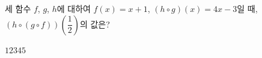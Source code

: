 \hspace*{2mm}\begin{minipage}[t]{\dimexpr\linewidth-2mm\relax}\vspace{0pt}
세 함수 $f$, $g$, $h$에 대하여 $f(x)=x+1$, $(h\circ g)(x)=4x-3$일 때, $(h\circ(g\circ f))\left(\dfrac{1}{2}\right)$의 값은?
\begin{choices32}{$1$}{$2$}{$3$}{$4$}{$5$}\end{choices32}\end{minipage}
